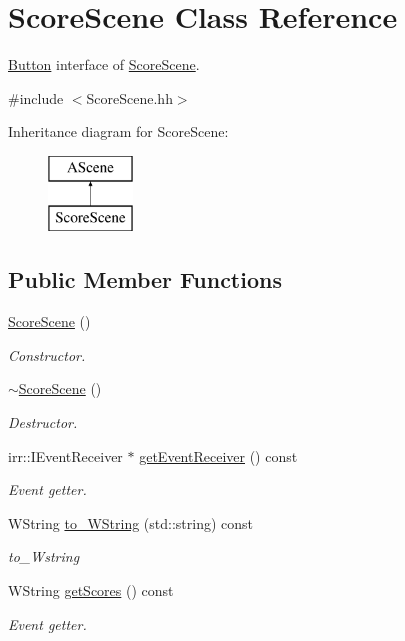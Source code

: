 \hypertarget{classScoreScene}{}\section{Score\+Scene Class Reference}
\label{classScoreScene}


\hyperlink{classButton}{Button} interface of \hyperlink{classScoreScene}{Score\+Scene}.  




{\ttfamily \#include $<$Score\+Scene.\+hh$>$}

Inheritance diagram for Score\+Scene\+:\begin{figure}[H]
\begin{center}
\leavevmode
\includegraphics[height=2.000000cm]{classScoreScene}
\end{center}
\end{figure}
\subsection*{Public Member Functions}
\begin{DoxyCompactItemize}
\item 
\hyperlink{classScoreScene_a832799285cf03c37c18c83d0adde2baa}{Score\+Scene} ()
\begin{DoxyCompactList}\small\item\em Constructor. \end{DoxyCompactList}\item 
\hyperlink{classScoreScene_a1d3866f2c756fea86ec9adfb0a3eeb36}{$\sim$\+Score\+Scene} ()
\begin{DoxyCompactList}\small\item\em Destructor. \end{DoxyCompactList}\item 
irr\+::\+I\+Event\+Receiver $\ast$ \hyperlink{classScoreScene_ae398ba58a33b3605a0c71265202534e2}{get\+Event\+Receiver} () const
\begin{DoxyCompactList}\small\item\em Event getter. \end{DoxyCompactList}\item 
W\+String \hyperlink{classScoreScene_a7cd50a0bd9be501c08f3f2855d61830e}{to\+\_\+\+W\+String} (std\+::string) const
\begin{DoxyCompactList}\small\item\em to\+\_\+\+Wstring \end{DoxyCompactList}\item 
W\+String \hyperlink{classScoreScene_af82d6c841dc42c42d83202d2c7ddf8c9}{get\+Scores} () const
\begin{DoxyCompactList}\small\item\em Event getter. \end{DoxyCompactList}\end{DoxyCompactItemize}


